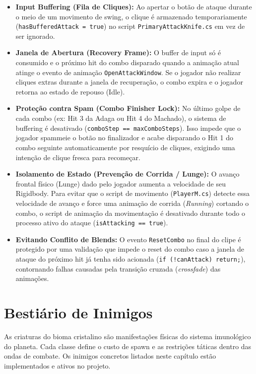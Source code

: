 \documentclass[a4paper,12pt]{report}
\begin{document}
\begin{itemize}
    \item \textbf{Input Buffering (Fila de Cliques):} Ao apertar o botão de ataque durante o meio de um movimento de swing, o clique é armazenado temporariamente (\texttt{hasBufferedAttack = true}) no script \texttt{PrimaryAttackKnife.cs} em vez de ser ignorado.
    \item \textbf{Janela de Abertura (Recovery Frame):} O buffer de input só é consumido e o próximo hit do combo disparado quando a animação atual atinge o evento de animação \texttt{OpenAttackWindow}. Se o jogador não realizar cliques extras durante a janela de recuperação, o combo expira e o jogador retorna ao estado de repouso (Idle).
    \item \textbf{Proteção contra Spam (Combo Finisher Lock):} No último golpe de cada combo (ex: Hit 3 da Adaga ou Hit 4 do Machado), o sistema de buffering é desativado (\texttt{comboStep == maxComboSteps}). Isso impede que o jogador spammeie o botão no finalizador e acabe disparando o Hit 1 do combo seguinte automaticamente por resquício de cliques, exigindo uma intenção de clique fresca para recomeçar.
    \item \textbf{Isolamento de Estado (Prevenção de Corrida / Lunge):} O avanço frontal físico (Lunge) dado pelo jogador aumenta a velocidade de seu Rigidbody. Para evitar que o script de movimento (\texttt{PlayerM.cs}) detecte essa velocidade de avanço e force uma animação de corrida (\textit{Running}) cortando o combo, o script de animação da movimentação é desativado durante todo o processo ativo do ataque (\texttt{isAttacking == true}).
    \item \textbf{Evitando Conflito de Blends:} O evento \texttt{ResetCombo} no final do clipe é protegido por uma validação que impede o reset do combo caso a janela de ataque do próximo hit já tenha sido acionada (\texttt{if (!canAttack) return;}), contornando falhas causadas pela transição cruzada (\textit{crossfade}) das animações.
\end{itemize}

\chapter{Bestiário de Inimigos}\label{cap:bestiario}

As criaturas do bioma cristalino são manifestações físicas do sistema imunológico do planeta. Cada classe define o custo de spawn e as restrições táticas dentro das ondas de combate. Os inimigos concretos listados neste capítulo estão implementados e ativos no projeto.
\end{document}
